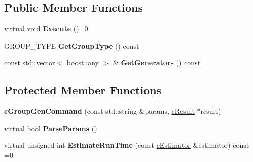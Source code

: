 \subsection*{\-Public \-Member \-Functions}
\begin{DoxyCompactItemize}
\item 
\hypertarget{classengine_1_1cGroupGenCommand_afba1ce51b5ffcebaf93febe1a982b207}{
virtual void {\bfseries \-Execute} ()=0}
\label{classengine_1_1cGroupGenCommand_afba1ce51b5ffcebaf93febe1a982b207}

\item 
\hypertarget{classengine_1_1cGroupGenCommand_ad00e8df48529e28c0b2310c8a6b08124}{
\-G\-R\-O\-U\-P\-\_\-\-T\-Y\-P\-E {\bfseries \-Get\-Group\-Type} () const }
\label{classengine_1_1cGroupGenCommand_ad00e8df48529e28c0b2310c8a6b08124}

\item 
\hypertarget{classengine_1_1cGroupGenCommand_a423b76a5c2dbf49db40655f968f15758}{
const std\-::vector$<$ boost\-::any $>$ \& {\bfseries \-Get\-Generators} () const }
\label{classengine_1_1cGroupGenCommand_a423b76a5c2dbf49db40655f968f15758}

\end{DoxyCompactItemize}
\subsection*{\-Protected \-Member \-Functions}
\begin{DoxyCompactItemize}
\item 
\hypertarget{classengine_1_1cGroupGenCommand_a155c6d2cf3ed40f2c507aa3f89c9db30}{
{\bfseries c\-Group\-Gen\-Command} (const std\-::string \&params, \hyperlink{classengine_1_1cResult}{c\-Result} $\ast$result)}
\label{classengine_1_1cGroupGenCommand_a155c6d2cf3ed40f2c507aa3f89c9db30}

\item 
\hypertarget{classengine_1_1cGroupGenCommand_a47e527898bf1ef6cba0c9c01b6173d13}{
virtual bool {\bfseries \-Parse\-Params} ()}
\label{classengine_1_1cGroupGenCommand_a47e527898bf1ef6cba0c9c01b6173d13}

\item 
\hypertarget{classengine_1_1cGroupGenCommand_aba96a75b873e66979b653f4e27540f3f}{
virtual unsigned int {\bfseries \-Estimate\-Run\-Time} (const \hyperlink{classengine_1_1cEstimator}{c\-Estimator} \&estimator) const =0}
\label{classengine_1_1cGroupGenCommand_aba96a75b873e66979b653f4e27540f3f}

\end{DoxyCompactItemize}
